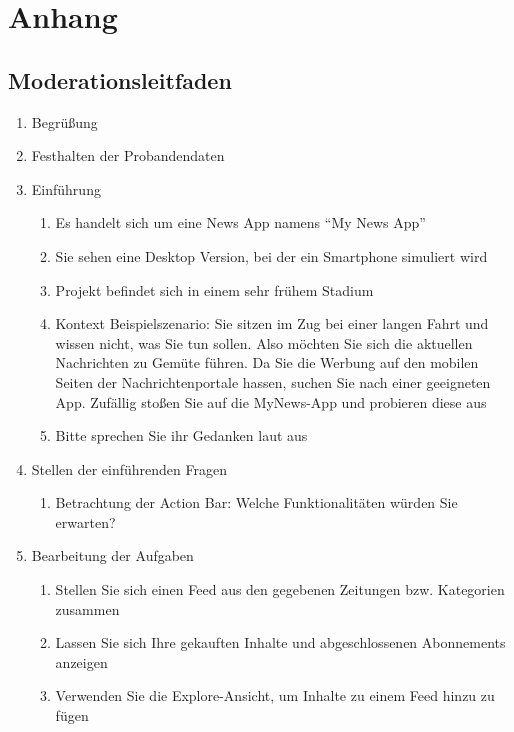 
\setcounter{secnumdepth}{0}
\section{Anhang}

\subsection{Moderationsleitfaden}

\begin{enumerate}
  \item Begrüßung
  \item Festhalten der Probandendaten

  \item Einführung

  \begin{enumerate}
    \item Es handelt sich um eine News App namens \enquote{My News App}
    \item Sie sehen eine Desktop Version, bei der ein Smartphone simuliert wird
    \item Projekt befindet sich in einem sehr frühem Stadium
    \item Kontext Beispielszenario: Sie sitzen im Zug bei einer langen Fahrt und wissen nicht, was Sie tun sollen. Also möchten Sie sich die aktuellen Nachrichten zu Gemüte führen. Da Sie die Werbung auf den  mobilen Seiten der Nachrichtenportale hassen, suchen Sie nach einer geeigneten App. Zufällig stoßen Sie auf die  MyNews-App und probieren diese aus
    \item Bitte sprechen Sie ihr Gedanken laut aus
  \end{enumerate}

  \item Stellen der einführenden Fragen

  \begin{enumerate}
    \item Betrachtung der Action Bar: Welche Funktionalitäten würden Sie erwarten?
  \end{enumerate}

  \item Bearbeitung der Aufgaben

  \begin{enumerate}
    \item Stellen Sie sich einen Feed aus den gegebenen Zeitungen bzw. Kategorien zusammen
    \item Lassen Sie sich Ihre gekauften Inhalte und abgeschlossenen Abonnements anzeigen
    \item Verwenden Sie die Explore-Ansicht, um Inhalte zu einem Feed hinzu zu fügen
  \end{enumerate}


\end{enumerate}

